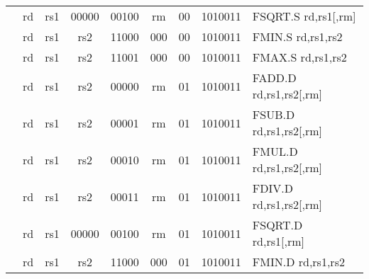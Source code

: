 \begin{table}[p]
\begin{small}
\begin{center}
\begin{tabular}{rccccccccccl}
&
\multicolumn{1}{|c|}{rd} &
\multicolumn{1}{c|}{rs1} &
\multicolumn{1}{c|}{00000} &
\multicolumn{3}{c|}{00100} &
\multicolumn{2}{c|}{rm} &
\multicolumn{1}{c|}{00} &
\multicolumn{1}{c|}{1010011} & FSQRT.S rd,rs1[,rm] \\
\cline{2-11}
  

&
\multicolumn{1}{|c|}{rd} &
\multicolumn{1}{c|}{rs1} &
\multicolumn{1}{c|}{rs2} &
\multicolumn{3}{c|}{11000} &
\multicolumn{2}{c|}{000} &
\multicolumn{1}{c|}{00} &
\multicolumn{1}{c|}{1010011} & FMIN.S rd,rs1,rs2 \\
\cline{2-11}
  

&
\multicolumn{1}{|c|}{rd} &
\multicolumn{1}{c|}{rs1} &
\multicolumn{1}{c|}{rs2} &
\multicolumn{3}{c|}{11001} &
\multicolumn{2}{c|}{000} &
\multicolumn{1}{c|}{00} &
\multicolumn{1}{c|}{1010011} & FMAX.S rd,rs1,rs2 \\
\cline{2-11}
  

&
\multicolumn{1}{|c|}{rd} &
\multicolumn{1}{c|}{rs1} &
\multicolumn{1}{c|}{rs2} &
\multicolumn{3}{c|}{00000} &
\multicolumn{2}{c|}{rm} &
\multicolumn{1}{c|}{01} &
\multicolumn{1}{c|}{1010011} & FADD.D rd,rs1,rs2[,rm] \\
\cline{2-11}
  

&
\multicolumn{1}{|c|}{rd} &
\multicolumn{1}{c|}{rs1} &
\multicolumn{1}{c|}{rs2} &
\multicolumn{3}{c|}{00001} &
\multicolumn{2}{c|}{rm} &
\multicolumn{1}{c|}{01} &
\multicolumn{1}{c|}{1010011} & FSUB.D rd,rs1,rs2[,rm] \\
\cline{2-11}
  

&
\multicolumn{1}{|c|}{rd} &
\multicolumn{1}{c|}{rs1} &
\multicolumn{1}{c|}{rs2} &
\multicolumn{3}{c|}{00010} &
\multicolumn{2}{c|}{rm} &
\multicolumn{1}{c|}{01} &
\multicolumn{1}{c|}{1010011} & FMUL.D rd,rs1,rs2[,rm] \\
\cline{2-11}
  

&
\multicolumn{1}{|c|}{rd} &
\multicolumn{1}{c|}{rs1} &
\multicolumn{1}{c|}{rs2} &
\multicolumn{3}{c|}{00011} &
\multicolumn{2}{c|}{rm} &
\multicolumn{1}{c|}{01} &
\multicolumn{1}{c|}{1010011} & FDIV.D rd,rs1,rs2[,rm] \\
\cline{2-11}
  

&
\multicolumn{1}{|c|}{rd} &
\multicolumn{1}{c|}{rs1} &
\multicolumn{1}{c|}{00000} &
\multicolumn{3}{c|}{00100} &
\multicolumn{2}{c|}{rm} &
\multicolumn{1}{c|}{01} &
\multicolumn{1}{c|}{1010011} & FSQRT.D rd,rs1[,rm] \\
\cline{2-11}
  

&
\multicolumn{1}{|c|}{rd} &
\multicolumn{1}{c|}{rs1} &
\multicolumn{1}{c|}{rs2} &
\multicolumn{3}{c|}{11000} &
\multicolumn{2}{c|}{000} &
\multicolumn{1}{c|}{01} &
\multicolumn{1}{c|}{1010011} & FMIN.D rd,rs1,rs2 \\
\cline{2-11}
  


\end{tabular}
\end{center}
\end{small}
\end{table}
